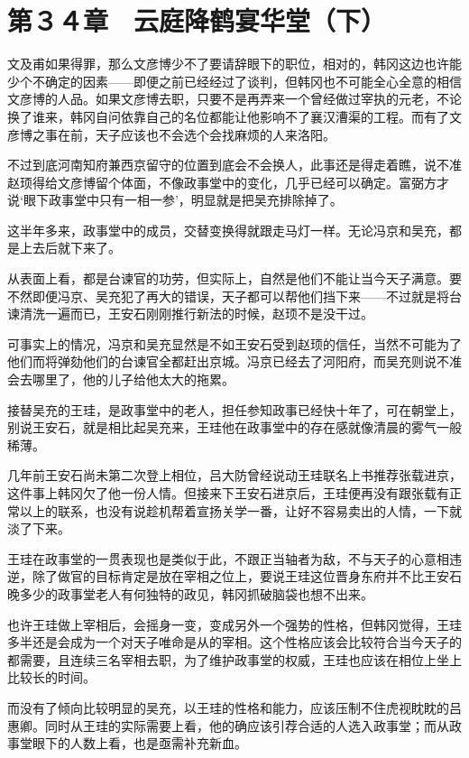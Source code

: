 \section{第３４章　云庭降鹤宴华堂（下）}

文及甫如果得罪，那么文彦博少不了要请辞眼下的职位，相对的，韩冈这边也许能少个不确定的因素——即便之前已经经过了谈判，但韩冈也不可能全心全意的相信文彦博的人品。如果文彦博去职，只要不是再弄来一个曾经做过宰执的元老，不论换了谁来，韩冈自问依靠自己的名位都能让他影响不了襄汉漕渠的工程。而有了文彦博之事在前，天子应该也不会选个会找麻烦的人来洛阳。

不过到底河南知府兼西京留守的位置到底会不会换人，此事还是得走着瞧，说不准赵顼得给文彦博留个体面，不像政事堂中的变化，几乎已经可以确定。富弼方才说‘眼下政事堂中只有一相一参’，明显就是把吴充排除掉了。

这半年多来，政事堂中的成员，交替变换得就跟走马灯一样。无论冯京和吴充，都是上去后就下来了。

从表面上看，都是台谏官的功劳，但实际上，自然是他们不能让当今天子满意。要不然即便冯京、吴充犯了再大的错误，天子都可以帮他们挡下来——不过就是将台谏清洗一遍而已，王安石刚刚推行新法的时候，赵顼不是没干过。

可事实上的情况，冯京和吴充显然是不如王安石受到赵顼的信任，当然不可能为了他们而将弹劾他们的台谏官全都赶出京城。冯京已经去了河阳府，而吴充则说不准会去哪里了，他的儿子给他太大的拖累。

接替吴充的王珪，是政事堂中的老人，担任参知政事已经快十年了，可在朝堂上，别说王安石，就是相比起吴充来，王珪他在政事堂中的存在感就像清晨的雾气一般稀薄。

几年前王安石尚未第二次登上相位，吕大防曾经说动王珪联名上书推荐张载进京，这件事上韩冈欠了他一份人情。但接来下王安石进京后，王珪便再没有跟张载有正常以上的联系，也没有说趁机帮着宣扬关学一番，让好不容易卖出的人情，一下就淡了下来。

王珪在政事堂的一贯表现也是类似于此，不跟正当轴者为敌，不与天子的心意相违逆，除了做官的目标肯定是放在宰相之位上，要说王珪这位晋身东府并不比王安石晚多少的政事堂老人有何独特的政见，韩冈抓破脑袋也想不出来。

也许王珪做上宰相后，会摇身一变，变成另外一个强势的性格，但韩冈觉得，王珪多半还是会成为一个对天子唯命是从的宰相。这个性格应该会比较符合当今天子的都需要，且连续三名宰相去职，为了维护政事堂的权威，王珪也应该在相位上坐上比较长的时间。

而没有了倾向比较明显的吴充，以王珪的性格和能力，应该压制不住虎视眈眈的吕惠卿。同时从王珪的实际需要上看，他的确应该引荐合适的人选入政事堂；而从政事堂眼下的人数上看，也是亟需补充新血。

